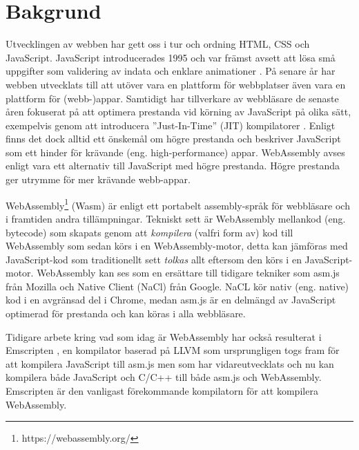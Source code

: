 \section{Bakgrund}

Utvecklingen av webben har gett oss i tur och ordning HTML, CSS och JavaScript. JavaScript introducerades 1995 och var främst avsett att lösa små uppgifter som validering av indata och enklare animationer \parencite{Moller2018}. På senare år har webben utvecklats till att utöver vara en plattform för webbplatser även vara en plattform för (webb-)appar. Samtidigt har tillverkare av webbläsare de senaste åren fokuserat på att optimera prestanda vid körning av JavaScript på olika sätt, exempelvis genom att introducera ''Just-In-Time'' (JIT) kompilatorer \parencite{HerreraChenLavoieHendren2018}. Enligt \textcite{ReiserBlaser2017} finns det dock alltid ett önskemål om högre prestanda och \textcite{Zakai2018} beskriver JavaScript som ett hinder för krävande (eng. high-performance) appar. WebAssembly avses enligt \textcite{HaasRossbergSchuffTitzerHolmanGohmanWagnerZakaiBastien2017} vara ett alternativ till JavaScript med högre prestanda. Högre prestanda ger utrymme för mer krävande webb-appar.

WebAssembly\footnote{https://webassembly.org/} (Wasm) är enligt \textcite{HaasRossbergSchuffTitzerHolmanGohmanWagnerZakaiBastien2017} ett portabelt assembly-språk för webbläsare och i framtiden andra tillämpningar. Tekniskt sett är WebAssembly mellankod (eng. bytecode) som skapats genom att \emph{kompilera} (valfri form av) kod till WebAssembly \parencite{Watt2018} som sedan körs i en WebAssembly-motor, detta kan jämföras med JavaScript-kod som traditionellt sett \emph{tolkas} allt eftersom den körs i en JavaScript-motor. WebAssembly kan ses som en ersättare till tidigare tekniker som asm.js från Mozilla och Native Client (NaCl) från Google. NaCL kör nativ (eng. native) kod i en avgränsad del i Chrome, medan asm.js \parencite{Zakai2018} är en delmängd av JavaScript optimerad för prestanda \parencite{VanEsNicolayStievenartDHondtDeRoover2016} och kan köras i alla webbläsare.

Tidigare arbete kring vad som idag är WebAssembly har också resulterat i Emscripten \parencite{Zakai2011}, en kompilator baserad på LLVM \parencite{LattnerAdve2014} som ursprungligen togs fram för att kompilera JavaScript till asm.js \parencite{Zakai2011} men som har vidareutvecklats \parencite{HaasRossbergSchuffTitzerHolmanGohmanWagnerZakaiBastien2017} och nu kan kompilera både JavaScript och C/C++ till både asm.js och WebAssembly. Emscripten är den vanligast förekommande kompilatorn för att kompilera WebAssembly.

